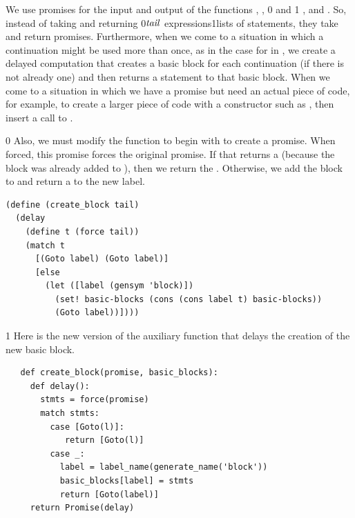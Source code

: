 \documentclass[7x10]{TimesAPriori_MIT}%
\def\racketEd{0}
\def\pythonEd{1}
\def\edition{1}
\newcommand{\racket}[1]{{\if\edition\racketEd{#1}\fi}}
\newcommand{\pythonColor}[0]{}
\newcommand{\python}[1]{{\if\edition\pythonEd\pythonColor #1\fi}}
\numberwithin{theorem}{chapter}
\numberwithin{definition}{chapter}
\numberwithin{equation}{chapter}
\begin{document}
We use promises for the input and output of the functions
, ,
%
\racket{ and }\python{ , and }.
%
So, instead of taking and returning \racket{$\mathit{tail}$
  expressions}\python{lists of statements}, they take and return
promises. Furthermore, when we come to a situation in which a
continuation might be used more than once, as in the case for
 in , we create a delayed computation
that creates a basic block for each continuation (if there is not
already one) and then returns a  statement to that basic
block. When we come to a situation in which we have a promise but need an
actual piece of code, for example, to create a larger piece of code with a
constructor such as , then insert a call to .
%
{\if\edition\racketEd
%
Also, we must modify the  function to begin with
 to create a promise. When forced, this promise forces the
original promise. If that returns a  (because the block was
already added to ), then we return the
. Otherwise, we add the block to  and
return a  to the new label.
\begin{center}
\begin{minipage}{\textwidth}
\begin{lstlisting}
(define (create_block tail)
  (delay
    (define t (force tail))
    (match t
      [(Goto label) (Goto label)]
      [else
        (let ([label (gensym 'block)])
          (set! basic-blocks (cons (cons label t) basic-blocks))
          (Goto label))])))
\end{lstlisting}
\end{minipage}
\end{center}
\fi}

{\if\edition\pythonEd\pythonColor
%
Here is the new version of the  auxiliary function
that delays the creation of the new basic block.\\
\begin{minipage}{\textwidth}
\begin{lstlisting}
   def create_block(promise, basic_blocks):
     def delay():
       stmts = force(promise)
       match stmts:
         case [Goto(l)]:
            return [Goto(l)]
         case _:
           label = label_name(generate_name('block'))
           basic_blocks[label] = stmts
           return [Goto(label)]
     return Promise(delay)
\end{lstlisting}
\end{minipage}

\fi}
\end{document}
